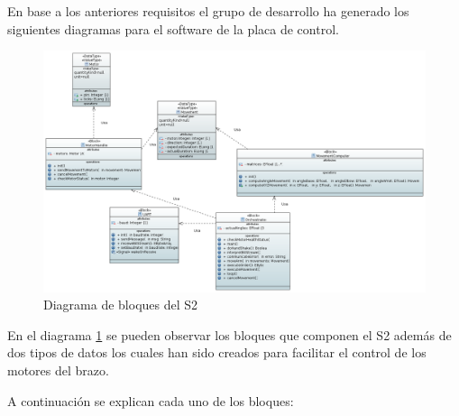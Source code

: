 En base a los anteriores requisitos el grupo de desarrollo ha generado los siguientes diagramas para el software de la placa de control.

\begin{figure}[H]
    \centering
    \includegraphics[width=\linewidth]{pictures/S2BlockDiagram.PNG}
    \caption{Diagrama de bloques del \ac{S2}}
    \label{fig:diagrama_bloques_s2}
\end{figure}

En el diagrama \ref{fig:diagrama_bloques_s2} se pueden observar los bloques que componen el \ac{S2} además de dos tipos de datos los cuales han sido creados para facilitar el control de los motores del brazo.

A continuación se explican cada uno de los bloques:

